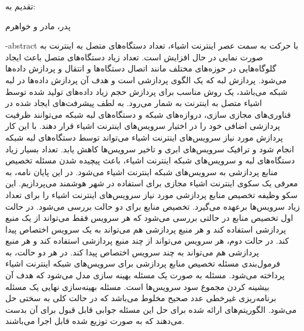 \cleartorightpage
\esalatPage

\cleartorightpage
\thispagestyle{empty}
{\Large تقدیم به:} \\
\begin{flushleft}
  {
    \huge
    پدر، مادر و خواهرم
  }
\end{flushleft}

\cleartorightpage
{}

\fa-abstract{
  با حرکت به سمت عصر اینترنت اشیاء، تعداد دستگاه‌های متصل به اینترنت به صورت نمایی در حال افزایش است.
  تعداد زیاد دستگاه‌های متصل باعث ایجاد گلوگاه‌هایی در حوزه‌های مختلف مانند اتصال دستگاه‌ها و انتقال و پردازش داده‌ها می‌شود.
  پردازش لبه که یک الگوی پردازشی است و هدف آن پردازش داده‌ها در لبه شبکه می‌باشد، یک روش مناسب برای پردازش حجم زیاد داده‌های تولید شده توسط اشیاء متصل به اینترنت به شمار می‌رود.
  به لطف پیشرفت‌های ایجاد شده در فناوری‌های مجازی سازی، دروازه‌های شبکه و دستگاه‌های لبه شبکه می‌توانند ظرفیت پردازشی اضافی خود را در اختیار سرویس‌های اینترنت اشیاء قرار دهند.
  با این کار پردازش‌ مورد نیاز سرویس‌های اینترنت اشیاء می‌تواند توسط دستگاه‌های لبه شبکه انجام شود و ترافیک سرویس‌های ابری و تاخیر سرویس‌ها کاهش یابد.
  تعداد بسیار زیاد دستگاه‌های لبه و سرویس‌های شبکه اینترنت اشیاء، باعث پیچیده شدن مسئله تخصیص منابع پردازشی به سرویس‌های شبکه اینترنت اشیاء می‌شود.
  در این پایان نامه، به معرفی یک سکوی اینترنت اشیاء مجازی برای استفاده در شهر هوشمند می‌پردازیم.
  این سکو وظیفه تخصیص منابع پردازشی مورد نیاز سرویس‌های اینترنت اشیاء را برای تعداد زیاد سرویس‌ها برعهده می‌گیرد.
  تخصیص منابع برای دو حالت بررسی می‌شود.
  در حالت اول تخصیص منابع در حالتی بررسی می‌شود که هر سرویس فقط می‌تواند از یک منبع پردازشی استفاده کند و هر منبع پردازشی هم می‌تواند به یک سرویس اختصاص پیدا کند.
  در حالت دوم، هر سرویس می‌تواند از چند منبع پردازشی استفاده کند و هر منبع پردازشی هم می‌تواند به چند سرویس اختصاص پیدا کند.
  در هر دو حالت، به فرمول‌بندی مسئله تخصیص منابع پردازشی برای سرویس‌های شبکه اینترنت اشیاء پرداخته می‌شود.
  مسئله به صورت یک مسئله بهینه سازی مدل می‌شود که هدف آن بیشینه کردن مجموع سود سرویس‌ها است.
  مسئله بهینه‌سازی نهایی یک مسئله برنامه‌ریزی غیرخطی عدد صحیح مخلوط می‌باشد که در حالت کلی به سختی حل می‌شود.
  الگوریتم‌های ارائه شده برای حل این مسئله جوابی قابل قبول برای آن بدست می‌دهند که به صورت توزیع شده قابل اجرا می‌باشند.
}

\cleartorightpage
\abstractPage

\cleartorightpage
